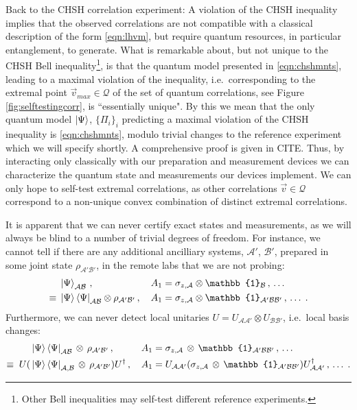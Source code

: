 Back to the CHSH correlation experiment: A violation of the CHSH inequality implies that the observed correlations are not compatible with a classical description of the form \ref{eqn:lhvm}, but require quantum resources, in particular entanglement, to generate. What is remarkable about, but not unique to the CHSH Bell inequality\footnote{Other Bell inequalities may self-test different reference experiments.}, is that the quantum model presented in \ref{eqn:chshmnts}, leading to a maximal violation of the inequality, i.e.\ corresponding to the extremal point $\Vec{v}_{max}\in\mathcal{Q}$ of the set of quantum correlations, see Figure \ref{fig:selftestingcorr}, is ``essentially unique". By this we mean that the only quantum model $\ket{\Psi}$, $\{\Pi_i\}_i$ predicting a maximal violation of the CHSH inequality is \ref{eqn:chshmnts}, modulo trivial changes to the reference experiment which we will specify shortly. A comprehensive proof is given in CITE.
Thus, by interacting only classically with our preparation and measurement devices we can characterize the quantum state and measurements our devices implement. We can only hope to self-test extremal correlations, as other correlations $\Vec{v}\in\mathcal{Q}$ correspond to a non-unique convex combination of distinct extremal correlations. 

It is apparent that we can never certify exact states and measurements, as we will always be blind to a number of trivial degrees of freedom. For instance, we cannot tell if there are any additional ancilliary systems, $\mathcal{A'}$, $\mathcal{B'}$, prepared in some joint state $\rho_{\mathcal{A'B'}}$, in the remote labs that we are not probing:
\begin{align*}
    & \ket{\Psi}_\mathcal{AB}\thinspace,\thinspace && A_{1} = \sigma_{z,\mathcal{A}}\otimes\mathbb{1}_{\mathcal{B}}\thinspace,\thinspace \dots \\
    \equiv\; & \ket{\Psi}\bra{\Psi}_{\mathcal{AB}}\otimes\rho_{\mathcal{A'B'}}\thinspace,\thinspace && A_1 = \sigma_{z,\mathcal{A}}\otimes\mathbb{1}_{\mathcal{A'BB'}}\thinspace,\thinspace\dots\; .
\end{align*}
Furthermore, we can never detect local unitaries $U=U_\mathcal{AA'}\otimes U_\mathcal{BB'}$, i.e.\ local basis changes:
\begin{align*}
    & \ket{\Psi}\bra{\Psi}_{\mathcal{AB}}\thinspace\otimes\thinspace\rho_{\mathcal{A'B'}}\thinspace,\thinspace && A_1 = \sigma_{z,\mathcal{A}}\thinspace\otimes\thinspace\mathbb{1}_{\mathcal{A'BB'}}\thinspace,\thinspace\dots \\ 
    \equiv\;  U(& \ket{\Psi}\bra{\Psi}_{\mathcal{A,B}}\thinspace\otimes\thinspace\rho_{\mathcal{A'B'}})U^{\dag}\thinspace,\thinspace && A_1 = U_{\mathcal{AA'}}(\sigma_{z,\mathcal{A}}\thinspace\otimes\thinspace\mathbb{1}_{\mathcal{A'BB'}})U_{\mathcal{AA'}}^{\dag}\thinspace,\thinspace\dots\; .
\end{align*}

